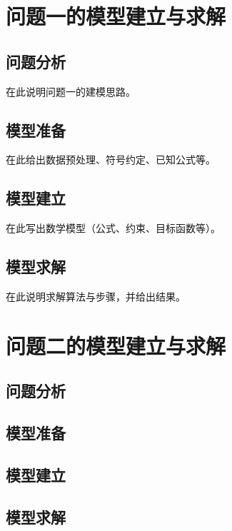 
\section{问题一的模型建立与求解}

\subsection{问题分析}
在此说明问题一的建模思路。

\subsection{模型准备}
在此给出数据预处理、符号约定、已知公式等。

\subsection{模型建立}
在此写出数学模型（公式、约束、目标函数等）。

\subsection{模型求解}
在此说明求解算法与步骤，并给出结果。

\section{问题二的模型建立与求解}

\subsection{问题分析}
\subsection{模型准备}
\subsection{模型建立}
\subsection{模型求解}

